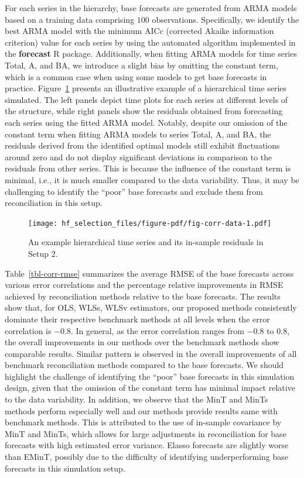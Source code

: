 \documentclass[
  12pt,
  11pt]{article}
\begin{document}
For each series in the hierarchy, base forecasts are generated from ARMA
models based on a training data comprising \(100\) observations.
Specifically, we identify the best ARMA model with the minimum AICc
(corrected Akaike information criterion) value for each series by using
the automated algorithm implemented in the \textbf{forecast} R package.
Additionally, when fitting ARMA models for time series Total, A, and BA,
we introduce a slight bias by omitting the constant term, which is a
common case when using some models to get base forecasts in practice.
Figure~\ref{fig-corr-data} presents an illustrative example of a
hierarchical time series simulated. The left panels depict time plots
for each series at different levels of the structure, while right panels
show the residuals obtained from forecasting each series using the
fitted ARMA model. Notably, despite our omission of the constant term
when fitting ARMA models to series Total, A, and BA, the residuals
derived from the identified optimal models still exhibit fluctuations
around zero and do not display significant deviations in comparison to
the residuals from other series. This is because the influence of the
constant term is minimal, i.e., it is much smaller compared to the data
variability. Thus, it may be challenging to identify the ``poor'' base
forecasts and exclude them from reconciliation in this setup.

\begin{figure}[!htb]

{\centering \texttt{[image: hf\_selection\_files/figure-pdf/fig-corr-data-1.pdf]}

}

\caption{\label{fig-corr-data}An example hierarchical time series and
its in-sample residuals in Setup 2.}

\end{figure}

Table~\ref{tbl-corr-rmse} summarizes the average RMSE of the base
forecasts across various error correlations and the percentage relative
improvements in RMSE achieved by reconciliation methods relative to the
base forecasts. The results show that, for OLS, WLSs, WLSv estimators,
our proposed methods consistently dominate their respective benchmark
methods at all levels when the error correlation is \(-0.8\). In
general, as the error correlation ranges from \(-0.8\) to \(0.8\), the
overall improvements in our methods over the benchmark methods show
comparable results. Similar pattern is observed in the overall
improvements of all benchmark reconciliation methods compared to the
base forecasts. We should highlight the challenge of identifying the
``poor'' base forecasts in this simulation design, given that the
omission of the constant term has minimal impact relative to the data
variability. In addition, we observe that the MinT and MinTs methods
perform especially well and our methods provide results same with
benchmark methods. This is attributed to the use of in-sample covariance
by MinT and MinTs, which allows for large adjustments in reconciliation
for base forecasts with high estimated error variance. Elasso forecasts
are slightly worse than EMinT, possibly due to the difficulty of
identifying underperforming base forecasts in this simulation setup.
\end{document}
